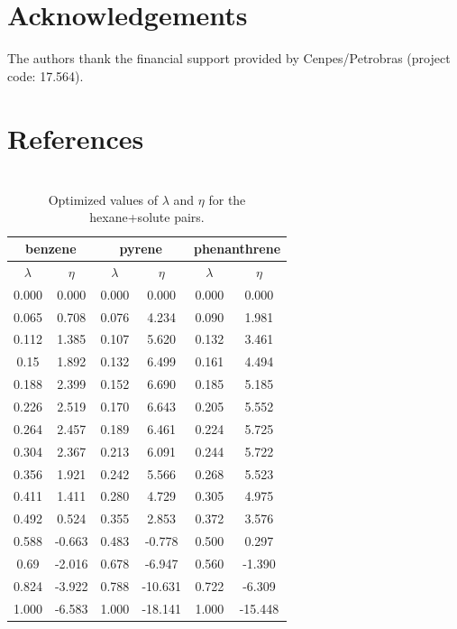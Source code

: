 \documentclass[final,12p,times,twocolumn]{elsarticle}
\begin{document}
	
	\section{Acknowledgements}
	
	The authors thank the financial support provided by Cenpes/Petrobras (project code: 17.564). 
	
	\section*{References}
	
	
	
	\appendix
	\section{}
	\label{}
	\begin{table}[h]
		\centering
		\caption{Optimized values of $\lambda $ and $\eta $ for the hexane+solute pairs.}
		\label{tbl:lambdahex}
		\begin{tabular}{cccccc}
			\hline\hline
			\multicolumn{2}{c}{benzene}&\multicolumn{2}{c}{pyrene}& \multicolumn{2}{c}{phenanthrene}\\
			\hline\hline
			$\lambda$ & $\eta$& $\lambda$ & $\eta$  & $\lambda$ & $\eta$   \\ 
			\hline\hline
			0.000     &0.000      & 0.000    &    0.000    &    0.000    &    0.000    \\
			0.065     &0.708  & 0.076    &    4.234    &    0.090    &    1.981    \\
			0.112     &1.385  & 0.107    &    5.620    &    0.132    &    3.461    \\
			0.15      &1.892  & 0.132    &    6.499    &    0.161    &    4.494    \\
			0.188     &2.399  & 0.152    &    6.690    &    0.185    &    5.185    \\
			0.226     &2.519  & 0.170    &    6.643    &    0.205    &    5.552    \\
			0.264     &2.457  & 0.189    &    6.461    &    0.224    &    5.725    \\
			0.304     &2.367  & 0.213    &    6.091    &    0.244    &    5.722    \\
			0.356     &1.921  & 0.242    &    5.566    &    0.268    &    5.523    \\
			0.411     &1.411  & 0.280    &    4.729    &    0.305    &    4.975    \\
			0.492     &0.524  & 0.355    &    2.853    &    0.372    &    3.576    \\
			0.588     &-0.663 & 0.483    &    -0.778    &    0.500    &    0.297    \\
			0.69      &-2.016 & 0.678    &    -6.947    &    0.560    &    -1.390    \\
			0.824     &-3.922 & 0.788    &    -10.631    &    0.722    &    -6.309    \\
			1.000         &-6.583  &1.000      &    -18.141    &    1.000    &    -15.448    \\
			\hline\hline   
		\end{tabular}
	\end{table}
\end{document}
